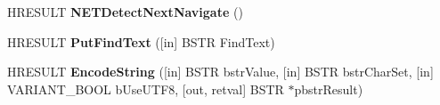 \begin{DoxyCompactItemize}
H\+R\+E\+S\+U\+LT {\bfseries N\+E\+T\+Detect\+Next\+Navigate} ()
\item 
\mbox{\label{interface_s_h_doc_vw_1_1_i_search_assistant_o_c_a9ceffde94ee23b1128312b095360e0f3}} 
H\+R\+E\+S\+U\+LT {\bfseries Put\+Find\+Text} (\mbox{[}in\mbox{]} B\+S\+TR Find\+Text)
\item 
\mbox{\label{interface_s_h_doc_vw_1_1_i_search_assistant_o_c_a22e9777a558dc125a4a03cea0cd59ffb}} 
H\+R\+E\+S\+U\+LT {\bfseries Encode\+String} (\mbox{[}in\mbox{]} B\+S\+TR bstr\+Value, \mbox{[}in\mbox{]} B\+S\+TR bstr\+Char\+Set, \mbox{[}in\mbox{]} V\+A\+R\+I\+A\+N\+T\+\_\+\+B\+O\+OL b\+Use\+U\+T\+F8, \mbox{[}out, retval\mbox{]} B\+S\+TR $\ast$pbstr\+Result)
\end{DoxyCompactItemize}

